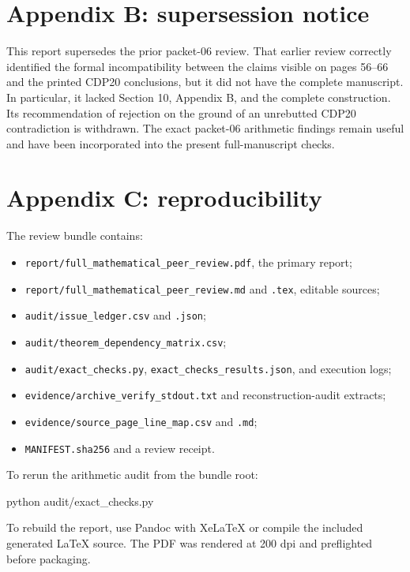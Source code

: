 \documentclass[
  10pt,
  letterpaper,
]{article}
\newenvironment{Shaded}{}{}
\newcommand{\ExtensionTok}[1]{#1}
\newcommand{\NormalTok}[1]{#1}
\providecommand{\tightlist}{%
  \setlength{\itemsep}{0pt}\setlength{\parskip}{0pt}}
\begin{document}
\section{Appendix B: supersession
notice}\label{appendix-b-supersession-notice}

This report supersedes the prior packet-06 review. That earlier review
correctly identified the formal incompatibility between the claims
visible on pages 56--66 and the printed CDP20 conclusions, but it did
not have the complete manuscript. In particular, it lacked Section 10,
Appendix B, and the complete construction. Its recommendation of
rejection on the ground of an unrebutted CDP20 contradiction is
withdrawn. The exact packet-06 arithmetic findings remain useful and
have been incorporated into the present full-manuscript checks.

\section{Appendix C: reproducibility}\label{appendix-c-reproducibility}

The review bundle contains:

\begin{itemize}
\tightlist
\item
  \texttt{report/full\_mathematical\_peer\_review.pdf}, the primary
  report;
\item
  \texttt{report/full\_mathematical\_peer\_review.md} and \texttt{.tex},
  editable sources;
\item
  \texttt{audit/issue\_ledger.csv} and \texttt{.json};
\item
  \texttt{audit/theorem\_dependency\_matrix.csv};
\item
  \texttt{audit/exact\_checks.py}, \texttt{exact\_checks\_results.json},
  and execution logs;
\item
  \texttt{evidence/archive\_verify\_stdout.txt} and reconstruction-audit
  extracts;
\item
  \texttt{evidence/source\_page\_line\_map.csv} and \texttt{.md};
\item
  \texttt{MANIFEST.sha256} and a review receipt.
\end{itemize}

To rerun the arithmetic audit from the bundle root:

\begin{Shaded}
\begin{Highlighting}[]
\ExtensionTok{python}\NormalTok{ audit/exact\_checks.py}
\end{Highlighting}
\end{Shaded}

To rebuild the report, use Pandoc with XeLaTeX or compile the included
generated LaTeX source. The PDF was rendered at 200 dpi and preflighted
before packaging.
\end{document}
